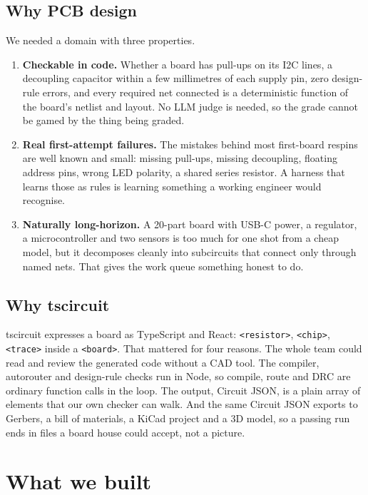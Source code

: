 \documentclass[11pt,a4paper]{article}
\newcommand{\code}[1]{\texttt{#1}}
\begin{document}
\subsection{Why PCB design}

We needed a domain with three properties.

\begin{enumerate}
  \item \textbf{Checkable in code.} Whether a board has pull-ups on its I2C lines, a decoupling capacitor within a few millimetres of each supply pin, zero design-rule errors, and every required net connected is a deterministic function of the board's netlist and layout. No LLM judge is needed, so the grade cannot be gamed by the thing being graded.
  \item \textbf{Real first-attempt failures.} The mistakes behind most first-board respins are well known and small: missing pull-ups, missing decoupling, floating address pins, wrong LED polarity, a shared series resistor. A harness that learns those as rules is learning something a working engineer would recognise.
  \item \textbf{Naturally long-horizon.} A 20-part board with USB-C power, a regulator, a microcontroller and two sensors is too much for one shot from a cheap model, but it decomposes cleanly into subcircuits that connect only through named nets. That gives the work queue something honest to do.
\end{enumerate}

\subsection{Why tscircuit}

tscircuit expresses a board as TypeScript and React: \code{<resistor>}, \code{<chip>}, \code{<trace>} inside a \code{<board>}. That mattered for four reasons. The whole team could read and review the generated code without a CAD tool. The compiler, autorouter and design-rule checks run in Node, so compile, route and DRC are ordinary function calls in the loop. The output, Circuit JSON, is a plain array of elements that our own checker can walk. And the same Circuit JSON exports to Gerbers, a bill of materials, a KiCad project and a 3D model, so a passing run ends in files a board house could accept, not a picture.

\section{What we built}
\end{document}
